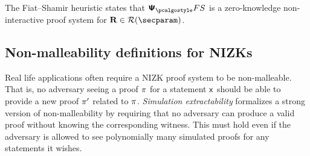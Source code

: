 \documentclass[runningheads,11pt]{llncs}
\begin{document}
\noindent
The Fiat--Shamir heuristic states that $\proofsystem_\fs$ is a zero-knowledge
non-interactive proof system for $\REL \in \RELGEN(\secparam)$.

\subsection{Non-malleability definitions for NIZKs}
\label{sec:simext_def}
Real life applications often require a NIZK proof system to be
non-malleable. That is, no adversary seeing a proof $\pi$ for a statement
$\mathsf{x}$ should be able to provide a new proof $\pi'$ related to $\pi$.
\emph{Simulation extractability} formalizes a strong version of non-malleability
by requiring that no adversary can produce a valid proof without knowing the
corresponding witness. This must hold even if the adversary is allowed to see
polynomially many simulated proofs for any statements it wishes.
\end{document}
